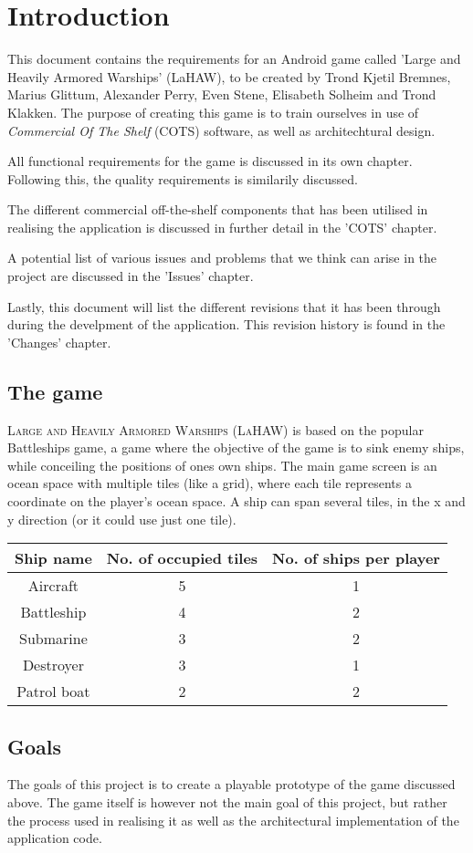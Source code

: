\chapter{Introduction}
This document contains the requirements for an Android game called 'Large and Heavily Armored Warships' (LaHAW), to be created by Trond Kjetil Bremnes, Marius Glittum, Alexander Perry, Even Stene, Elisabeth Solheim and Trond Klakken. The purpose of creating this game is to train ourselves in use of \emph{Commercial Of The Shelf} (COTS) software, as well as architechtural design.

All functional requirements for the game is discussed in its own chapter. Following this, the quality requirements is similarily discussed.

The different commercial off-the-shelf components that has been utilised in realising the application is discussed in further detail in the 'COTS' chapter.

A potential list of various issues and problems that we think can arise in the project are discussed in the 'Issues' chapter.

Lastly, this document will list the different revisions that it has been through during the develpment of the application. This revision history is found in the 'Changes' chapter.



\section{The game}
\textsc{Large and Heavily Armored Warships (LaHAW)} is based on the popular Battleships\cite{battleship} game, a game where the objective of the game is to sink enemy ships, while conceiling the positions of ones own ships. The main game screen is an ocean space with multiple tiles (like a grid), where each tile represents a coordinate on the player's ocean space. A ship can span several tiles, in the x and y direction (or it could use just one tile). 
\\


\begin{tabular}{| c | c | c |}
    \hline
    \rowcolor[gray]{0.8}
    \hspace{0.3cm}\textbf{Ship name}\hspace{0.3cm} & \textbf{No. of occupied tiles} & \textbf{No. of ships per player} \\
    \hline
    Aircraft & 5 & 1 \\
    Battleship & 4 & 2 \\
    Submarine & 3 & 2 \\
    Destroyer & 3 & 1 \\
    Patrol boat & 2 & 2 \\
    \hline
\end{tabular}
\label{shiptable}





\section{Goals}
The goals of this project is to create a playable prototype of the game discussed above. The game itself is however not the main goal of this project, but rather the process used in realising it as well as the architectural implementation of the application code.
